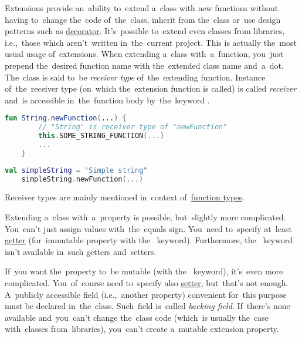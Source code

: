 \label{kotlinextension}
Extensions provide an~ability to~extend a~class with new functions without having to~change the~code of~the~class, inherit from the~class or~use design patterns such as \hyperref[decoratordp]{decorator}.
It's~possible to~extend even classes from libraries, i.e.,~those which aren't~written in~the~current project.
This is actually the~most usual usage of~extensions.
When extending a~class with~a~function, you~just prepend the~desired function name with the~extended class name and~a~dot.
The~class is said to~be \textit{receiver type} of~the~extending function.
Instance of~the~receiver type (on~which the~extension function is called) is called \textit{receiver} and~is accessible in~the~function body by~the~keyword .

\begin{lstlisting}[language=Kotlin, title={Extension definition}]
    fun String.newFunction(...) {
        // "String" is receiver type of "newFunction"
        this.SOME_STRING_FUNCTION(...)
        ...
    }
\end{lstlisting}
\newpage

\begin{lstlisting}[language=Kotlin, title={Usage}]
    val simpleString = "Simple string"
    simpleString.newFunction(...)
\end{lstlisting}

\note Receiver types are mainly mentioned in~context of~\hyperref[kotlinanonymousreceivertype]{function types}.

\label{kotlinextensionproperty}
\noindent Extending a~class with~a~property is possible, but~slightly more complicated.
You~can't just assign values with~the~equals sign.
You~need to~specify at~least \hyperref[kotlingetset]{getter} (for~immutable property with the~ keyword).
Furthermore, \mbox{the \hyperref[kotlingetset]{}} keyword isn't available in~such getters and~setters.

If~you want the~property to~be mutable (with the~ keyword), it's~even more complicated.
You~of~course need to~specify also \hyperref[kotlingetset]{setter}, but~that's not enough.
A~publicly accessible field (i.e.,~another property) convenient for~this purpose must be declared in~the~class.
Such~field is~called \textit{backing field}.
If~there's none available and~you~can't change the~class code (which~is usually the~case with~classes from~libraries), you~can't create a~mutable extension property.

